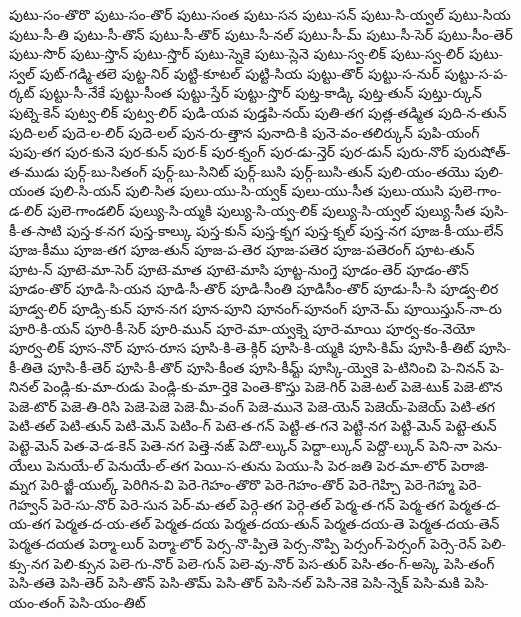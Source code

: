 {పుటు-సం-తొరొ
పుటు-సం-తొర్
పుటు-సంత
పుటు-సన
పుటు-సన్
పుటు-సి-య్వల్
పుటు-సియ
పుటు-సీ-తి
పుటు-సీ-తొన్
పుటు-సీ-తొర్
పుటు-సీ-నల్
పుటు-సీ-మ్
పుటు-సీ-సెర్
పుటు-సీం-తెర్
పుటు-సొర్
పుటు-స్తొన్
పుటు-స్తొర్
పుటు-స్నెకె
పుటు-స్లెనె
పుటు-స్వ-లిక్
పుటు-స్వ-లిర్
పుటు-స్వల్
పుట్-గడ్మి-తలె
పుట్ట-నిర్
పుట్టి-కూటల్
పుట్టి-సియ
పుట్టు-తొర్
పుట్టు-స-నుర్
పుట్టు-స-ప-ర్కట్
పుట్టు-సీ-నేకే
పుట్టు-సీంత
పుట్టు-స్తేర్
పుట్టు-స్తొర్
పుట్త-కాడ్కి
పుట్త-తున్
పుట్తు-ర్కున్
పుట్నె-కెన్
పుట్వ-లిక్
పుట్వ-లిర్
పుడి-యవ
పుడ్తపి-నయ్
పుతి-తగ
పుత్ల-తడ్మిత
పుది-న-తున్
పుది-లల్
పుదె-ల-లిర్
పుదె-లల్
పున-రు-త్తాన
పునాది-కి
పునె-వం-తలిర్కున్
పుపి-యంగ్
పుపు-తగ
పుర-కునె
పుర-కున్
పుర-క్
పుర-క్నంగ్
పుర-డు-న్తెర్
పుర-డున్
పురు-నొర్
పురుషోత్-త-ముడు
పుర్గ్-బు-సితంగ్
పుర్గ్-బు-సినిట్
పుర్గ్-బుసి
పుర్గ్-బుసి-తున్
పులి-యం-తయొ
పులి-యంత
పులి-సి-యన్
పులి-సిత
పులు-యు-సి-య్వక్
పులు-యు-సీత
పులు-యుసి
పులె-గాం-డ-లిర్
పులె-గాండలిర్
పుల్యు-సి-య్మకి
పుల్యు-సి-య్వ-లిక్
పుల్యు-సి-య్వల్
పుల్యు-సీత
పుసి-కీ-త-సాటి
పుస్త-క-నగ
పుస్త-కాల్కు
పుస్త-కున్
పుస్త-క్నగ
పుస్త-క్నల్
పుస్త-నగ
పూజ-కీ-యు-లేన్
పూజ-కీము
పూజ-తగ
పూజ-తున్
పూజ-ప-తెర
పూజ-పతెర
పూజ-పతెరంగ్
పూట-తున్
పూట-న్
పూటె-మా-సెర్
పూటె-మాత
పూటె-మాసి
పూట్ట-నుంగ్తె
పూడం-తెర్
పూడం-తొన్
పూడం-తొర్
పూడి-సి-యన
పూడి-సీ-తొర్
పూడి-సీంతి
పూడిసీం-తొర్
పూడు-సీ-సి
పూడ్వ-లిర
పూడ్వ-లిర్
పూడ్సి-కున్
పూన-నగ
పూన-పూని
పూనంగ్-పూనంగ్
పూనె-మ్
పూయిస్తున్-నా-రు
పూరి-కి-యన్
పూరి-కీ-సెర్
పూరి-మున్
పూరె-మా-య్వక్నె
పూరె-మాయి
పూర్వ-కం-నెయో
పూర్వ-లిక్
పూస-నొర్
పూస-రూస
పూసి-కి-తె-క్గిర్
పూసి-కి-య్మకి
పూసి-కిమ్
పూసి-కీ-తిట్
పూసి-కీ-తితె
పూసి-కీ-తెర్
పూసి-కీ-తొర్
పూసి-కీంత
పూసి-కీమ్ట్
పూస్కి-య్వెకె
పె-టినించి
పె-నినన్
పె-నినల్
పెండ్లి-కు-మా-రుడు
పెండ్లి-కు-మా-ర్తెకె
పెంతె-కొస్తు
పెజె-గిర్
పెజె-టల్
పెజె-టుక్
పెజె-టొన
పెజె-టొర్
పెజె-తి-రిసి
పెజె-పెజె
పెజె-మీ-వంగ్
పెజె-మునె
పెజె-యెన్
పెజెయ్-పెజెయ్
పెటి-తగ
పెటి-తల్
పెటి-తున్
పెటి-మెన్
పెటిం-గ్
పెటె-త-గన్
పెట్టి-త-గనె
పెట్టి-నగ
పెట్టి-మెన్
పెట్టె-తున్
పెట్టె-మెన్
పెత-వె-డ-కెన్
పెతె-నగ
పెత్తె-నఙ్
పెదొ-ల్కున్
పెద్దా-ల్కున్
పెద్దొ-ల్కున్
పెని-నా
పెను-యేలు
పెనుయే-ల్
పెనుయే-ల్-తగ
పెయి-స-తును
పెయు-సి
పెర-జతి
పెర-మా-లొర్
పెరాజి-మ్నగ
పెరి-జ్జీ-యుల్క్
పెరిగిన-వి
పెరె-గెహం-తొరొ
పెరె-గెహం-తొర్
పెరె-గెహ్చి
పెరె-గెహ్మ
పెరె-గెహ్వన్
పెరె-సు-నొర్
పెరె-సున
పెర్-మ-తల్
పెర్గె-తగ
పెర్గె-తల్
పెర్మ-త-గన్
పెర్మ-తగ
పెర్మత-ద-య-తగ
పెర్మత-ద-య-తల్
పెర్మత-దయ
పెర్మత-దయ-తున్
పెర్మత-దయ-తె
పెర్మత-దయ-తెన్
పెర్మత-దయత
పెర్మా-లుర్
పెర్మా-లొర్
పెర్స-నొ-ప్పితె
పెర్స-నొప్పి
పెర్సంగ్-పెర్సంగ్
పెర్సె-రెన్
పెలి-క్సు-నగ
పెలి-క్సున
పెలె-గు-నొర్
పెలె-గున్
పెలె-వు-నొర్
పెస-తుర్
పెసి-తం-గ్-అస్కె
పెసి-తంగ్
పెసి-తతె
పెసి-తెర్
పెసి-తొన్
పెసి-తొమ్
పెసి-తొర్
పెసి-నల్
పెసి-నెకె
పెసి-న్నెక్
పెసి-మకి
పెసి-యం-తంగ్
పెసి-యం-తిట్
}
